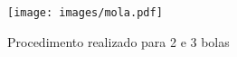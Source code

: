 \begin{figure}[h]
    \centering
    \texttt{[image: images/mola.pdf]}
    \caption{Procedimento realizado para 2 e 3 bolas}
    \label{fig:figure2}
\end{figure}
